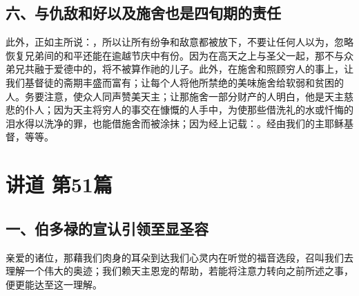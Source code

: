 
\subsection{六、与仇敌和好以及施舍也是四旬期的责任}

此外，正如主所说：，所以让所有纷争和敌意都被放下，不要让任何人以为，忽略恢复兄弟间的和平还能在逾越节庆中有份。因为在高天之上与圣父一起，那不与众弟兄共融于爱德中的，将不被算作祂的儿子。此外，在施舍和照顾穷人的事上，让我们基督徒的斋期丰盛而富有；让每个人将他所禁绝的美味施舍给软弱和贫困的人。务要注意，使众人同声赞美天主；让那施舍一部分财产的人明白，他是天主慈悲的仆人；因为天主将穷人的事交在慷慨的人手中，为使那些借洗礼的水或忏悔的泪水得以洗净的罪，也能借施舍而被涂抹；因为经上记载：。经由我们的主耶稣基督，等等。\par



\section{讲道 第51篇}

\par


\subsection{一、伯多禄的宣认引领至显圣容}

亲爱的诸位，那藉我们肉身的耳朵到达我们心灵内在听觉的福音选段，召叫我们去理解一个伟大的奥迹；我们赖天主恩宠的帮助，若能将注意力转向之前所述之事，便更能达至这一理解。\par

